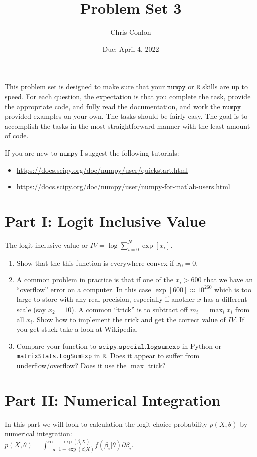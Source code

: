 \documentclass{article}
\begin{document}
\title{Problem Set 3} 
\author{Chris Conlon}
\date{Due: April 4, 2022}
\maketitle
This problem set is designed to make sure that your $\mathtt{numpy}$ or \texttt{R} skills are up to speed. For each question, the expectation is that you complete the task, provide the appropriate code, and fully read the documentation, and work the $\mathtt{numpy}$ provided examples on your own.  The tasks should be fairly easy.  The goal is to accomplish the tasks in the most straightforward manner with the least amount of code.  

If you are new to $\mathtt{numpy}$ I suggest the following tutorials:
\begin{itemize}
\item \url{https://docs.scipy.org/doc/numpy/user/quickstart.html}
\item  \url{https://docs.scipy.org/doc/numpy/user/numpy-for-matlab-users.html}
\end{itemize}

\section*{\normalsize Part I: Logit Inclusive Value}
The logit inclusive value or $IV = \log \sum_{i=0}^N \exp[x_i]$.
\begin{enumerate}
\item Show that the this function is everywhere convex if $x_0=0$.
\item A common problem in practice is that if one of the $x_i > 600$ that we have an ``overflow'' error on a computer. In this case $\exp[600] \approx 10^{260}$ which is too large to store with any real precision, especially if another $x$ has a different scale (say $x_2=10$). A common ``trick'' is to subtract off $m_i = \max_i x_i$ from all $x_i$.  Show how to implement the trick and get the correct value of $IV$. If you get stuck take a look at Wikipedia.
\item Compare your function to $\mathtt{scipy.special.logsumexp}$ in Python or \texttt{matrixStats.LogSumExp} in \texttt{R}. Does it appear to suffer from underflow/overflow? Does it use the $\max$ trick?
\end{enumerate}

\section*{\normalsize Part II: Numerical Integration}
In this part we will look to calculation the logit choice probability $p(X,\theta)$ by numerical integration:\\
 $p(X,\theta) =\int_{-\infty}^{\infty} \frac{\exp(\beta_i X)}{1+ \exp(\beta_i X)} f(\beta_i | \theta) \partial \beta_i$. \\
\end{document}
